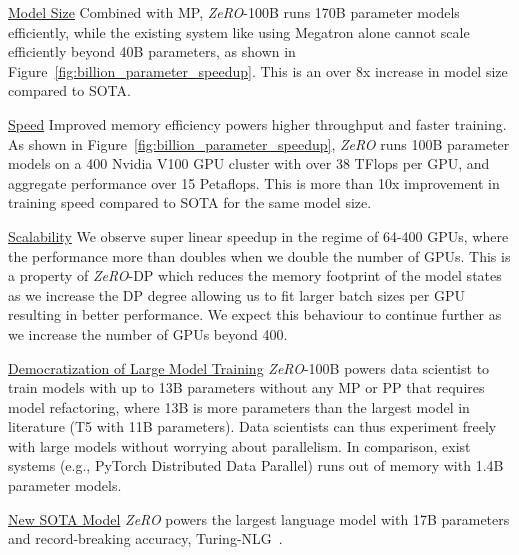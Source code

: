 \documentclass{article}
\newcommand{\name}{\emph{ZeRO}\xspace}
\begin{document}
\underline{Model Size} Combined with MP, \name-100B runs 170B parameter models efficiently, while the existing system like using Megatron alone cannot scale efficiently beyond 40B parameters, as shown in Figure~\ref{fig:billion_parameter_speedup}.
This is an over 8x increase in model size compared to SOTA.

\underline{Speed} Improved memory efficiency powers higher throughput and faster training. 
As shown in Figure~\ref{fig:billion_parameter_speedup}, \name runs 100B parameter models on a 400 Nvidia V100 GPU cluster with over 38 TFlops per GPU, and aggregate performance over 15 Petaflops. This is more than 10x improvement in training speed compared to SOTA for the same model size.

\underline{Scalability} We observe super linear speedup in the regime of 64-400 GPUs, where the performance more than doubles when we double the number of GPUs. This is a property of \name-DP which reduces the memory footprint of the model states as we increase the DP degree allowing us to fit larger batch sizes per GPU resulting in better performance. We expect this behaviour to continue further as we increase the number of GPUs beyond 400.

\underline{Democratization of Large Model Training} \name-100B powers data scientist to train models with up to 13B parameters without any MP or PP that requires model refactoring, where 13B is more parameters than the largest model in literature (T5 with 11B parameters). Data scientists can thus experiment freely with large models without worrying about parallelism. In comparison, exist systems (e.g., PyTorch Distributed Data Parallel) runs out of memory with 1.4B parameter models. 

\underline{New SOTA Model} \name powers the largest language model with 17B parameters and record-breaking accuracy, Turing-NLG~\cite{t-nlg}.
\end{document}

